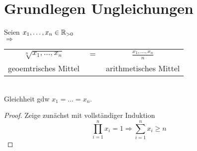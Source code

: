 \chapter{Grundlegen Ungleichungen}

\begin{satz}
	Seien $x_1, \dots, x_n \in \mathbb{R}_{>0}$\\
$\Rightarrow$
	\begin{tabular}{ccc}
		$ \sqrt[n]{x_1, \dots, x_n}$ & $=$ & $\frac{x_1, \dots, x_n}{n}$ \\
		geoemtrisches Mittel &  & arithmetisches Mittel \\
	\end{tabular}\\
Gleichheit gdw $x_1 = \dots = x_n$.
\end{satz}

\begin{proof}
	Zeige zunächst mit vollständiger Induktion\\
	\begin{equation}
	\prod_{i=1}^{n}x_i=1 \Rightarrow \sum_{i=1}^{n} x_i \geq n
	\end{equation}
	\item 
	\QEDA
\end{proof}

